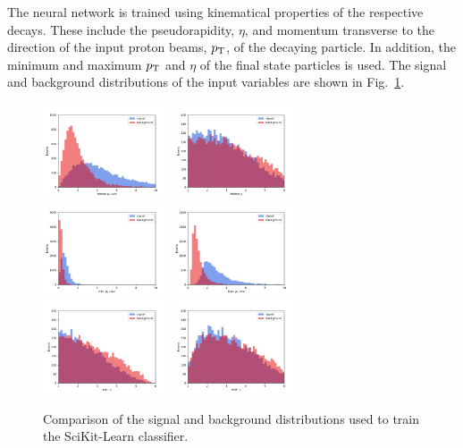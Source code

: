\documentclass[final,5p,times,twocolumn]{elsarticle}
\def\pt         {\mbox{$p_{\rm T}$}\xspace}
\begin{document}
The neural network is trained using kinematical properties of the respective decays.
These include the pseudorapidity, $\eta$, and momentum transverse to the direction of the 
input proton beams, \pt, of the decaying particle. In addition, the minimum and maximum \pt and $\eta$ 
of the final state particles is used. The signal and background distributions of the input variables
are shown in Fig.~\ref{fig:inputs}.
%
\begin{figure}[t]
\centering
\includegraphics[width=0.33\textwidth]{pt_comp.pdf}
\includegraphics[width=0.33\textwidth]{eta_comp.pdf}
\includegraphics[width=0.33\textwidth]{minpt_comp.pdf}
\includegraphics[width=0.33\textwidth]{maxpt_comp.pdf}
\includegraphics[width=0.33\textwidth]{mineta_comp.pdf}
\includegraphics[width=0.33\textwidth]{maxeta_comp.pdf}
\caption{\small Comparison of the signal and background distributions
used to train the SciKit-Learn classifier.}
\label{fig:inputs}
\end{figure}
\end{document}
